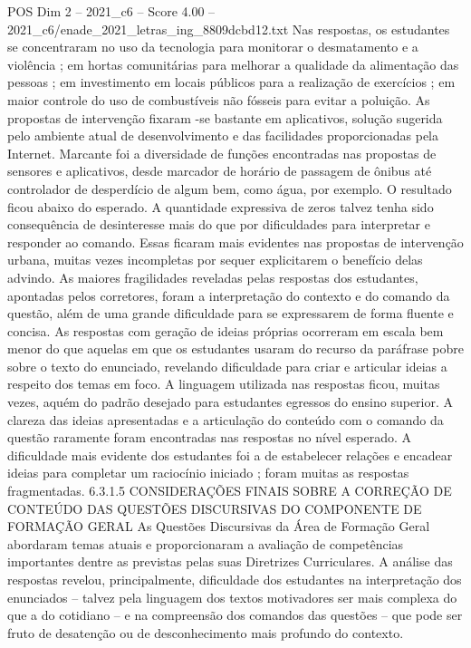 \begin{textsample}{POS Dim 2 – 2021\_c6 – Score 4.00 – 2021\_c6/enade\_2021\_letras\_ing\_8809dcbd12.txt}
Nas respostas, os estudantes se concentraram no uso da tecnologia para monitorar o desmatamento e a violência ; em hortas comunitárias para melhorar a qualidade da alimentação das pessoas ; em investimento em locais públicos para a realização de exercícios ; em maior controle do uso de combustíveis não fósseis para evitar a poluição.
As propostas de intervenção fixaram -se bastante em aplicativos, solução sugerida pelo ambiente atual de desenvolvimento e das facilidades proporcionadas pela Internet.
Marcante foi a diversidade de funções encontradas nas propostas de sensores e aplicativos, desde marcador de horário de passagem de ônibus até controlador de desperdício de algum bem, como água, por exemplo.
O resultado ficou abaixo do esperado.
A quantidade expressiva de zeros talvez tenha sido consequência de desinteresse mais do que por dificuldades para interpretar e responder ao comando.
Essas ficaram mais evidentes nas propostas de intervenção urbana, muitas vezes incompletas por sequer explicitarem o benefício delas advindo.
As maiores fragilidades reveladas pelas respostas dos estudantes, apontadas pelos corretores, foram a interpretação do contexto e do comando da questão, além de uma grande dificuldade para se expressarem de forma fluente e concisa.
As respostas com geração de ideias próprias ocorreram em escala bem menor do que aquelas em que os estudantes usaram do recurso da paráfrase pobre sobre o texto do enunciado, revelando dificuldade para criar e articular ideias a respeito dos temas em foco.
A linguagem utilizada nas respostas ficou, muitas vezes, aquém do padrão desejado para estudantes egressos do ensino superior.
A clareza das ideias apresentadas e a articulação do conteúdo com o comando da questão raramente foram encontradas nas respostas no nível esperado.
A dificuldade mais evidente dos estudantes foi a de estabelecer relações e encadear ideias para completar um raciocínio iniciado ; foram muitas as respostas fragmentadas. 6.3.1.5 CONSIDERAÇÕES FINAIS SOBRE A CORREÇÃO DE CONTEÚDO DAS QUESTÕES DISCURSIVAS DO COMPONENTE DE FORMAÇÃO GERAL As Questões Discursivas da Área de Formação Geral abordaram temas atuais e proporcionaram a avaliação de competências importantes dentre as previstas pelas suas Diretrizes Curriculares.
A análise das respostas revelou, principalmente, dificuldade dos estudantes na interpretação dos enunciados – talvez pela linguagem dos textos motivadores ser mais complexa do que a do cotidiano – e na compreensão dos comandos das questões – que pode ser fruto de desatenção ou de desconhecimento mais profundo do contexto.

\end{textsample}
